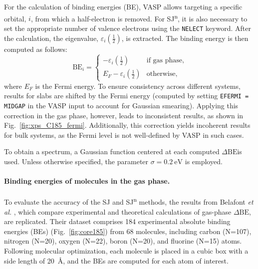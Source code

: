 \documentclass[12pt,a4paper]{article}
\def\dbe{\ensuremath{\Delta\text{BE}}}
\begin{document}
For the calculation of binding energies (BE), VASP allows targeting a specific orbital, $i$, from which a half-electron is removed. For SJ\textsuperscript{n}, it is also necessary to set the appropriate number of valence electrons using the \texttt{NELECT} keyword. After the calculation, the eigenvalue, $\varepsilon_i\left(\frac{1}{2}\right)$, is extracted. The binding energy is then computed as follows:
\begin{equation}
	\text{BE}_i = 	\begin{cases}
		-\varepsilon_i\left(\tfrac{1}{2}\right) & \text{if gas phase}, \\
		E_F - \varepsilon_i\left(\tfrac{1}{2}\right) & \text{otherwise}, \label{eq:xpsbe}
	\end{cases}
\end{equation}
where $E_F$ is the Fermi energy. To ensure consistency across different systems, results for slabs are shifted by the Fermi energy (computed by setting \texttt{EFERMI = MIDGAP} in the VASP input to account for Gaussian smearing). Applying this correction in the gas phase, however, leads to inconsistent results, as shown in Fig.~\ref{fig:xps_C185_fermi}. Additionally, this correction yields incoherent results for bulk systems, as the Fermi level is not well-defined by VASP in such cases.

To obtain a spectrum, a Gaussian function centered at each computed \dbe is used. Unless otherwise specified, the parameter $\sigma = \SI{0.2}{\electronvolt}$ is employed.

\paragraph{Binding energies of molecules in the gas phase.}
To evaluate the accuracy of the SJ and SJ\textsuperscript{n} methods, the results from Belafont \textit{et al.} \cite{pueyobellafontPredictingCoreLevel2017}, which compare experimental and theoretical calculations of gas-phase \dbe, are replicated. Their dataset comprises 184 experimental absolute binding energies (BEs) (Fig.~\ref{fig:core185}) from 68 molecules, including carbon (N=107), nitrogen (N=20), oxygen (N=22), boron (N=20), and fluorine (N=15) atoms. Following molecular optimization, each molecule is placed in a cubic box with a side length of \SI{20}{\angstrom}, and the BEs are computed for each atom of interest.
\end{document}
